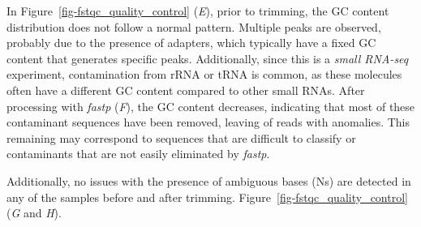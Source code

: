 \documentclass[
  11pt,
  letterpaper,
]{book}
\begin{document}
In Figure~\ref{fig-fstqc_quality_control} (\emph{E}), prior to trimming,
the GC content distribution does not follow a normal pattern. Multiple
peaks are observed, probably due to the presence of adapters, which
typically have a fixed GC content that generates specific peaks.
Additionally, since this is a \emph{small RNA-seq} experiment,
contamination from rRNA or tRNA is common, as these molecules often have
a different GC content compared to other small RNAs. After processing
with \emph{fastp} (\emph{F}), the GC content decreases, indicating that
most of these contaminant sequences have been removed, leaving of reads
with anomalies. This remaining may correspond to sequences that are
difficult to classify or contaminants that are not easily eliminated by
\emph{fastp}.

Additionally, no issues with the presence of ambiguous bases (Ns) are
detected in any of the samples before and after trimming.
Figure~\ref{fig-fstqc_quality_control} (\emph{G} and \emph{H}).
\end{document}
